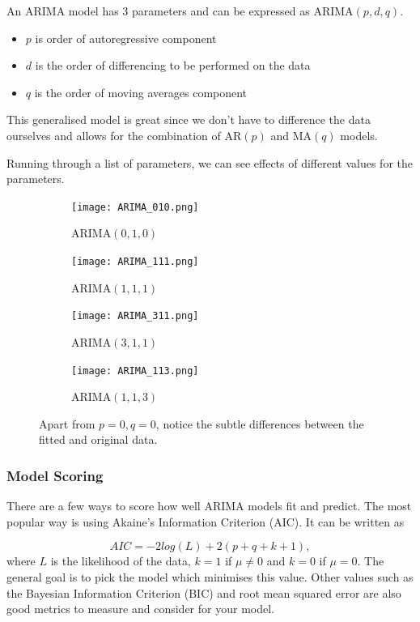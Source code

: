 \documentclass{article}
\begin{document}
  An ARIMA model has 3 parameters and can be expressed as ARIMA$(p,d,q)$.
  \begin{itemize}
    \item $p$ is order of autoregressive component
    \item $d$ is the order of differencing to be performed on the data
    \item $q$ is the order of moving averages component
  \end{itemize}
  This generalised model is great since we don't have to difference the data ourselves and allows for the combination of AR$(p)$ and MA$(q)$ models.  

  Running through a list of parameters, we can see effects of different values for the parameters.

  \begin{figure}[H]
    \centering
    \captionsetup{justification=centering}
    \begin{subfigure}[b]{0.49\linewidth}
      \texttt{[image: ARIMA\_010.png]}
      \caption{ARIMA$(0, 1, 0)$}
    \end{subfigure}
    \begin{subfigure}[b]{0.49\linewidth}
      \texttt{[image: ARIMA\_111.png]}
      \caption{ARIMA$(1, 1, 1)$}
    \end{subfigure}
    \begin{subfigure}[b]{0.49\linewidth}
      \texttt{[image: ARIMA\_311.png]}
      \caption{ARIMA$(3, 1, 1)$}
    \end{subfigure}
    \begin{subfigure}[b]{0.49\linewidth}
      \texttt{[image: ARIMA\_113.png]}
      \caption{ARIMA$(1, 1, 3)$}
    \end{subfigure}
    \caption{Apart from $p=0, q=0$, notice the subtle differences between the fitted and original data.}
  \end{figure}

  \subsubsection{Model Scoring}
  There are a few ways to score how well ARIMA models fit and predict. The most popular way is using Akaine's Information Criterion (AIC). It can be written as 

  \begin{equation*}
    AIC = -2log(L) + 2(p + q + k + 1),
  \end{equation*}
  where $L$ is the likelihood of the data, $k = 1$ if $\mu \ne 0$ and $k = 0$ if $\mu = 0$. The general goal is to pick the model which minimises this value. Other values such as the Bayesian Information Criterion (BIC) and root mean squared error are also good metrics to measure and consider for your model.
\end{document}
